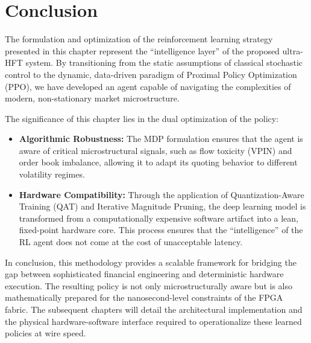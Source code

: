 \section{Conclusion}
The formulation and optimization of the reinforcement learning strategy presented in this chapter represent the ``intelligence layer'' of the proposed ultra-HFT system. By transitioning from the static assumptions of classical stochastic control to the dynamic, data-driven paradigm of Proximal Policy Optimization (PPO), we have developed an agent capable of navigating the complexities of modern, non-stationary market microstructure.

The significance of this chapter lies in the dual optimization of the policy:
\begin{itemize}
    \item \textbf{Algorithmic Robustness:} The MDP formulation ensures that the agent is aware of critical microstructural signals, such as flow toxicity (VPIN) and order book imbalance, allowing it to adapt its quoting behavior to different volatility regimes.
    \item \textbf{Hardware Compatibility:} Through the application of Quantization-Aware Training (QAT) and Iterative Magnitude Pruning, the deep learning model is transformed from a computationally expensive software artifact into a lean, fixed-point hardware core. This process ensures that the ``intelligence'' of the RL agent does not come at the cost of unacceptable latency.
\end{itemize}

In conclusion, this methodology provides a scalable framework for bridging the gap between sophisticated financial engineering and deterministic hardware execution. The resulting policy is not only microstructurally aware but is also mathematically prepared for the nanosecond-level constraints of the FPGA fabric. The subsequent chapters will detail the architectural implementation and the physical hardware-software interface required to operationalize these learned policies at wire speed.
